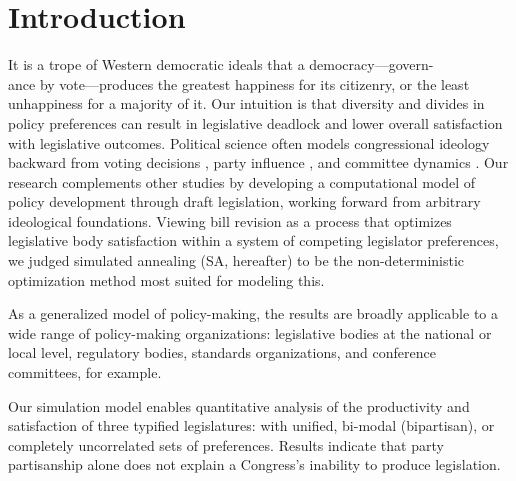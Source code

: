 \documentclass[pdftex,12pt,oribibl]{llncs}
\begin{document}
\section{Introduction}
%
%
%
%

It is a trope of Western democratic ideals that a democracy---govern-\\ance by vote---produces the greatest happiness for its citizenry, or the least unhappiness for a majority of it.
Our intuition is that diversity and divides in policy preferences can result in legislative deadlock and lower overall satisfaction with legislative outcomes.
Political science often models congressional ideology backward from voting decisions \parencite{m74, k89}, party influence \parencite{cm93,cm05,a95,k91, k98}, and committee dynamics \parencite{sw87, gk89, m04}.
Our research complements other studies by developing a computational model of policy development through draft legislation, working forward from arbitrary ideological foundations.
Viewing bill revision as a process that optimizes legislative body satisfaction within a system of competing legislator preferences, we judged simulated annealing (SA, hereafter) to be the non-deterministic optimization method most suited for modeling this.

As a generalized model of policy-making, the results are broadly applicable to a wide range of policy-making organizations: legislative bodies at the national or local level, regulatory bodies, standards organizations, and conference committees, for example.

Our simulation model enables quantitative analysis of the productivity and satisfaction of three typified legislatures: with unified, bi-modal (bipartisan), or completely uncorrelated sets of preferences. 
Results indicate that party partisanship alone does not explain a Congress's inability to produce legislation.
\end{document}
